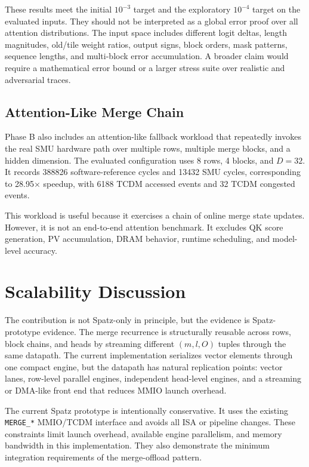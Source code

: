 \documentclass[conference]{IEEEtran}
\begin{document}
These results meet the initial $10^{-3}$ target and the exploratory
$10^{-4}$ target on the evaluated inputs. They should not be interpreted as a
global error proof over all attention distributions. The input space includes
different logit deltas, length magnitudes, old/tile weight ratios, output
signs, block orders, mask patterns, sequence lengths, and multi-block error
accumulation. A broader claim would require a mathematical error bound or a
larger stress suite over realistic and adversarial traces.

\subsection{Attention-Like Merge Chain}

Phase B also includes an attention-like fallback workload that repeatedly
invokes the real SMU hardware path over multiple rows, multiple merge blocks,
and a hidden dimension. The evaluated configuration uses 8 rows, 4 blocks, and
$D=32$. It records 388826 software-reference cycles and 13432 SMU cycles,
corresponding to 28.95$\times$ speedup, with 6188 TCDM accessed events and 32
TCDM congested events.

This workload is useful because it exercises a chain of online merge state
updates. However, it is not an end-to-end attention benchmark. It excludes QK
score generation, PV accumulation, DRAM behavior, runtime scheduling, and
model-level accuracy.

\section{Scalability Discussion}

The contribution is not Spatz-only in principle, but the evidence is
Spatz-prototype evidence. The merge recurrence is structurally reusable across
rows, block chains, and heads by streaming different $(m,l,O)$ tuples through
the same datapath. The current implementation serializes vector elements
through one compact engine, but the datapath has natural replication points:
vector lanes, row-level parallel engines, independent head-level engines, and
a streaming or DMA-like front end that reduces MMIO launch overhead.

The current Spatz prototype is intentionally conservative. It uses the
existing \texttt{MERGE\_*} MMIO/TCDM interface and avoids all ISA or pipeline
changes. These constraints limit launch overhead, available engine
parallelism, and memory bandwidth in this implementation. They also
demonstrate the minimum integration requirements of the merge-offload pattern.
\end{document}

